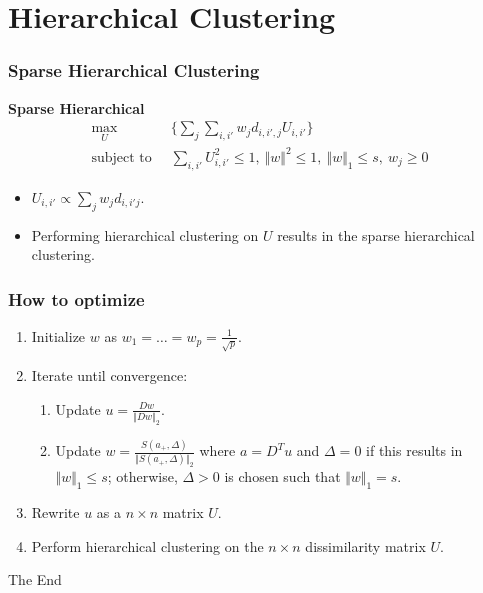 \documentclass{beamer}
\begin{document}
\section{Hierarchical Clustering}
\begin{frame}
\frametitle{Sparse Hierarchical Clustering}
{\Large \bf Sparse Hierarchical}
\begin{eqnarray*}
\max_U &~ \{ \sum_j \sum_{i,i'} w_j d_{i,i',j} U_{i,i'} \} \\
\text{subject to } &~ \sum_{i,i'} U^2_{i,i'} \le 1,~ \Vert w \Vert^2 \le 1,~ \Vert w \Vert_1 \le s, ~ w_j \ge 0
\end{eqnarray*}
\begin{itemize}
    \item $U_{i,i'} \propto \sum_j w_j d_{i,i'j}$.
    \item Performing hierarchical clustering on $U$ results in the sparse hierarchical clustering.
\end{itemize}

\end{frame}
\begin{frame}
\frametitle{How to optimize}
\begin{enumerate}
\item Initialize $w$ as $w_1=\ldots=w_p=\frac{1}{\sqrt{p}}$.
\item Iterate until convergence:
    \begin{enumerate}
        \item  Update $u = \frac{Dw}{\Vert Dw \Vert_2}$.
        \item  Update $w = \frac{S(a_{+},\Delta)}{\Vert S(a_{+},\Delta) \Vert_2}$ where $a = D^Tu$ and $\Delta = 0$ if this results in $\Vert w \Vert_1 \le s$; otherwise, $\Delta > 0$ is chosen such that $\Vert w \Vert_1 = s$.
    \end{enumerate}
\item Rewrite $u$ as a $n \times n$ matrix $U$.
\item Perform hierarchical clustering on the $n \times n$ dissimilarity matrix $U$.
\end{enumerate}
\end{frame}



\begin{frame}
\Huge{\centerline{The End}}
\end{frame}

\end{document}
